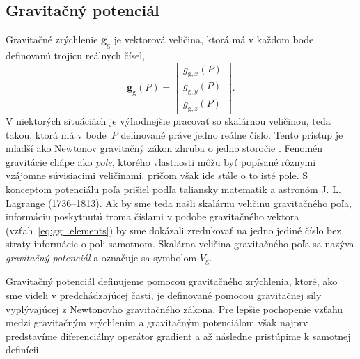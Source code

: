 \documentclass[a4paper, 12pt]{book}
\newcommand{\gidx}{\mathrm g}
\let\vec\mathbf
\begin{document}
\subsection{Gravitačný potenciál}
\label{sec:vg}

Gravitačné zrýchlenie $\vec g_\gidx$ je vektorová veličina, ktorá má v každom 
bode definovanú trojicu reálnych čísel,
%
\begin{equation}
\label{eq:gg_elements}
\vec g_{\gidx}(P) =
\begin{bmatrix}
g_{\gidx,x}(P) \\[2ex]
g_{\gidx,y}(P) \\[2ex]
g_{\gidx,z}(P)
\end{bmatrix}
{.}
\end{equation}
%
V niektorých situáciách je výhodnejšie pracovať so skalárnou veličinou, teda 
takou, ktorá má v bode~$P$ definované práve jedno reálne číslo.  Tento prístup 
je mladší ako Newtonov gravitačný zákon zhruba o jedno storočie 
\citep{MacMillan1930,Jekeli2015}.  Fenomén gravitácie chápe ako \emph{pole}, 
ktorého vlastnosti môžu byť popísané rôznymi vzájomne súvisiacimi veličinami, 
pričom však ide stále o to isté pole.  S konceptom potenciálu poľa prišiel 
podľa \cite{MacMillan1930} taliansky matematik a astronóm J. L. Lagrange 
(1736--1813).  Ak by sme teda našli skalárnu veličinu gravitačného poľa, 
informáciu poskytnutú troma číslami v podobe gravitačného vektora 
(vzťah~\ref{eq:gg_elements}) by sme dokázali zredukovať na jedno jediné číslo 
bez straty informácie o poli samotnom.  Skalárna veličina gravitačného poľa sa 
nazýva \emph{gravitačný potenciál} a označuje sa symbolom $V_\gidx$.

Gravitačný potenciál definujeme pomocou gravitačného zrýchlenia, ktoré, ako sme 
videli v predchádzajúcej časti, je definované pomocou gravitačnej sily 
vyplývajúcej z Newtonovho gravitačného zákona.  Pre lepšie pochopenie vzťahu 
medzi gravitačným zrýchlením a gravitačným potenciálom však najprv predstavíme 
diferenciálny operátor gradient a až následne pristúpime k samotnej definícii.
\end{document}
